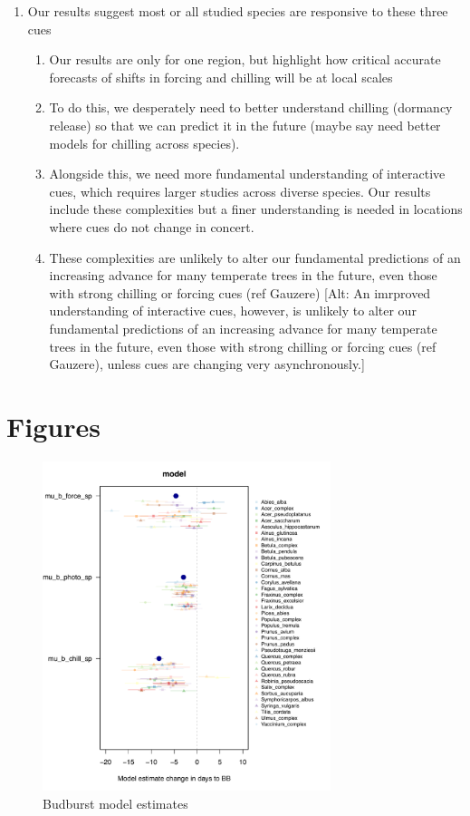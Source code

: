 \documentclass[11pt,letter]{article}
\begin{document}
\begin{enumerate}
\item Our results suggest most or all studied species are responsive to these three cues
\begin{enumerate}
\item Our results are only for one region, but highlight how critical accurate forecasts of shifts in forcing and chilling will be at local scales
\item To do this, we desperately need to better understand chilling (dormancy release) so that we can predict it in the future (maybe say need better models for chilling across species). 
\item Alongside this, we need more fundamental understanding of interactive cues, which requires larger studies across diverse species. Our results include these complexities but a finer understanding is needed in locations where cues do not change in concert.
\item These complexities are unlikely to alter our fundamental predictions of an increasing advance for many temperate trees in the future, even those with strong chilling or forcing cues (ref Gauzere) [Alt: An imrproved understanding of interactive cues, however, is unlikely to alter our fundamental predictions of an increasing advance for many temperate trees in the future, even those with strong chilling or forcing cues (ref Gauzere), unless cues are changing very asynchronously.]
\end{enumerate}

\end{enumerate}

\section* {Figures}

\newpage

\begin{figure}[h!]
\centering
\noindent \includegraphics[width=0.75\textwidth]{..//..//analyses/bb_analysis/figures/muplotmodelspcom_expramp_fp_chillports.pdf}
\caption{Budburst model estimates}
\label{fig:mu}
\end{figure}
\end{document}

